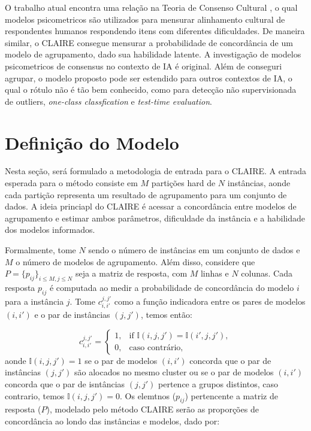 O trabalho atual encontra uma relação na Teoria de Consenso Cultural \cite{Batchelder88}, o qual modelos psicometricos são utilizados para mensurar alinhamento cultural de respondentes humanos respondendo itens com diferentes dificuldades. De maneira similar, o \gls{CLAIRE} consegue mensurar a probabilidade de concordância de um modelo de agrupamento, dado sua habilidade latente. A investigação de modelos psicometricos de consensus no contexto de \gls{IA} é original. Além de conseguri agrupar, o modelo proposto pode ser estendido para outros contextos de \gls{IA}, o qual o rótulo não é tão bem conhecido, como para detecção não supervisionada de outliers, \textit{one-class classfication} e \textit{test-time evaluation}.

\section{Definição do Modelo}

Nesta seção, será formulado a metodologia de entrada para o \gls{CLAIRE}. A entrada esperada para o método consiste em $M$ partições hard de $N$ instâncias, aonde cada partição representa um resultado de agrupamento para um conjunto de dados. A ideia princiapl do \gls{CLAIRE} é acessar a concordância entre modelos de agrupamento e estimar ambos parâmetros, dificuldade da instância e a habilidade dos modelos informados.

Formalmente, tome $N$ sendo o número de instâncias em um conjunto de dados e $M$ o número de modelos de agrupamento. Além disso, considere que $P = \{p_{ij}\}_{i\leq M, j\leq N}$ seja a matriz de resposta, com $M$ linhas e $N$ colunas. Cada resposta $p_{ij}$ é computada ao medir a probabilidade de concordância do modelo $i$ para a instância $j$. Tome $c^{j,j'}_{i,i'}$ como a função indicadora entre os pares de modelos   $(i,i')$ e o par de instâncias $(j,j')$, temos então:

\begin{equation}\label{eq:agree_indicator}
    c^{j,j'}_{i,i'} = \begin{cases}
    
            1, & \mbox{if } 
             \mathbb{I}(i,j,j')= \mathbb{I}(i',j,j'),  
             
             \\
             
             0, & \mbox{caso contrário},

       \end{cases}
\end{equation}
\noindent aonde  $\mathbb{I}(i,j,j')=1$ se o par de modelos $(i, i')$ concorda que o par de instâncias $(j, j')$ são alocados no mesmo cluster ou se o par de modelos $(i, i')$ concorda que o par de isntâncias $(j, j')$ pertence a grupos distintos, caso contrario, temos $\mathbb{I}(i,j,j')=0$. Os elemtnos ($p_{ij}$) pertencente a matriz de resposta ($P$), modelado pelo método \gls{CLAIRE} serão as proporções de concordância ao londo das instâncias e modelos, dado por:

